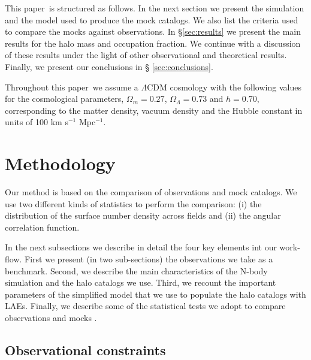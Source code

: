 \documentclass[usenatbib]{mn2e}
\newcommand{\documentname}{paper~}
\begin{document}
This \documentname is structured as follows. In the next section we present
the simulation and the model used to produce the mock catalogs. We
also list the criteria used to compare the mocks against
observations. In \S \ref{sec:results} we present the main results for
the halo mass and occupation fraction. We continue with a discussion
of these results under the light of other observational and
theoretical results. Finally, we present our conclusions in \S
\ref{sec:conclusions}.  

Throughout this \documentname we assume a $\Lambda$CDM cosmology with the
following values for the cosmological parameters, $\Omega_{m}=0.27$,
$\Omega_{\Lambda}=0.73$ and $h=0.70$, corresponding to the matter
density, vacuum density and the Hubble constant in units of 100 km
s$^{-1}$ Mpc$^{-1}$. 

\section{Methodology}


Our method is based on the comparison of observations and mock
catalogs. We use two different kinds of statistics to perform the
comparison: (i) the distribution of the surface number density
across fields and (ii) the angular correlation function.

In the next subsections we describe in detail the four key
elements int our work-flow. First we present (in two sub-sections) the
observations we take as a benchmark. Second, we describe the main
characteristics of the N-body simulation and the halo catalogs we
use. Third, we recount the important parameters of the simplified
model that we use to populate the halo catalogs with LAEs. Finally, we
describe some of the statistical tests we adopt to compare
observations and mocks .

\subsection{Observational constraints}
\end{document}
